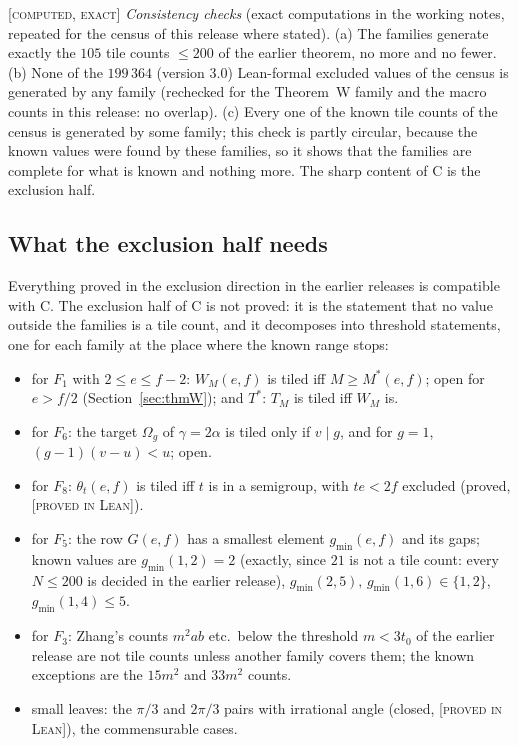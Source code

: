 \documentclass[11pt,reqno]{amsart}
\theoremstyle{plain}
\theoremstyle{definition}
\newcommand{\lab}[1]{\textup{[\textsc{#1}]}}
\newcommand{\PL}{\lab{proved in Lean}}
\newcommand{\CE}{\lab{computed, exact}}
\begin{document}
\medskip
\noindent\CE{} \emph{Consistency checks} (exact computations in the working notes, repeated for the census of this release where stated).
(a) The families generate exactly the $105$ tile counts $\le200$ of the earlier theorem, no more and no fewer.
(b) None of the $199\,364$ (version 3.0) Lean-formal excluded values of the census is generated by any family (rechecked for the Theorem~W family and the macro counts in this release: no overlap).
(c) Every one of the known tile counts of the census is generated by some family; this check is partly circular, because the known values were found by these families, so it shows that the families are complete for what is known and nothing more.
The sharp content of C is the exclusion half.

\subsection{What the exclusion half needs}
Everything proved in the exclusion direction in the earlier releases is compatible with C. The exclusion half of C is not proved: it is the statement that no value outside the families is a tile count, and it decomposes into threshold statements, one for each family at the place where the known range stops:
\begin{itemize}
\item[$W^*$] for $F_1$ with $2\le e\le f-2$: $W_M(e,f)$ is tiled iff $M\ge M^*(e,f)$; open for $e>f/2$ (Section~\ref{sec:thmW}); and $T^*$: $T_M$ is tiled iff $W_M$ is.
\item[$V,A'$] for $F_6$: the target $\Omega_g$ of $\gamma=2\alpha$ is tiled only if $v\mid g$, and for $g=1$, $(g-1)(v-u)<u$; open.
\item[$\Theta$] for $F_8$: $\theta_t(e,f)$ is tiled iff $t$ is in a semigroup, with $te<2f$ excluded (proved, \PL{}).
\item[$S_3$] for $F_5$: the row $G(e,f)$ has a smallest element $g_{\min}(e,f)$ and its gaps; known values are $g_{\min}(1,2)=2$ (exactly, since $21$ is not a tile count: every $N\le200$ is decided in the earlier release), $g_{\min}(2,5),\,g_{\min}(1,6)\in\{1,2\}$, $g_{\min}(1,4)\le5$.
\item[$Z$] for $F_3$: Zhang's counts $m^2a b$ etc.\ below the threshold $m<3t_0$ of the earlier release are not tile counts unless another family covers them; the known exceptions are the $15m^2$ and $33m^2$ counts.
\item small leaves: the $\pi/3$ and $2\pi/3$ pairs with irrational angle (closed, \PL{}), the commensurable cases.
\end{itemize}
\end{document}
